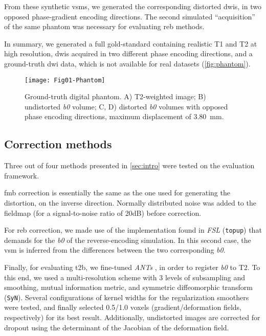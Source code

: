 From these synthetic \glspl*{vsm}, we generated
the corresponding distorted \glspl*{dwi}, in two opposed
phase-gradient encoding directions. The second simulated
``acquisition'' of the same phantom was necessary 
for evaluating \gls*{reb} methods.

In summary, we generated 
a full gold-standard containing realistic T1 and T2
at high resolution, \glspl*{dwi} acquired in two
different phase encoding directions, and a ground-truth
\gls*{dwi} data, which is not available for real datasets
(\autoref{fig:phantom}).


\begin{figure}[thpb]
   \centering
   \texttt{[image: Fig01-Phantom]}
   \caption{Ground-truth digital phantom.
   A) T2-weighted image; B) undistorted \textit{b0} volume;
   C, D) distorted \textit{b0} volumes with opposed phase 
   encoding directions, maximum displacement of 3.80~mm.}
   \label{fig:phantom}
\end{figure}

\subsection{Correction methods}
\label{sec:correction}
Three out of four methods presented in \autoref{sec:intro}
were tested on the evaluation framework. 

\Gls*{fmb} correction
is essentially the same as the one used for generating the 
distortion, on the inverse direction. Normally distributed 
noise was added to the fieldmap (for a signal-to-noise 
ratio of 20dB) before correction.

For \Gls*{reb} correction, we made use of the implementation found 
in \emph{FSL} (\texttt{topup})
that demands for the \textit{b0} of the reverse-encoding simulation.
In this second case, the \gls*{vsm} is inferred from the differences
between the two corresponding \textit{b0}.

Finally, for evaluating \Gls*{t2b},
we fine-tuned \emph{ANTs} \cite{avants_ants:_2013},
in order to register \textit{b0} to T2. To this end, we used a
multi-resolution scheme with 3 levels of subsampling and smoothing,
mutual information metric, and symmetric diffeomorphic transform 
(\texttt{SyN}). Several configurations of kernel widths for the 
regularization smoothers were tested, and finally selected 
0.5/1.0 voxels (gradient/deformation fields, respectively) 
for its best result. Additionally, undistorted images are 
corrected for dropout using the determinant
of the Jacobian of the deformation field.

